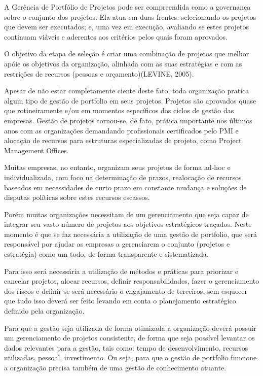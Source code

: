 \documentclass[12pt,a4paper,ruledheader,tocpage=prefix,floatnumber=continuous,pagestart=folhaderosto,font=times]{abnt}
\begin{document}
A Gerência de Portfólio de Projetos pode ser compreendida como a governança sobre o conjunto dos projetos. Ela atua em duas frentes: selecionando os 
projetos que devem ser executados; e, uma vez em execução, avaliando se estes projetos continuam viáveis e aderentes aos critérios pelos quais foram
aprovados.

O objetivo da etapa de seleção é criar uma combinação de projetos que melhor apóie os objetivos da organização, alinhada com as suas estratégias e 
com as restrições de recursos (pessoas e orçamento)(LEVINE, 2005).

Apesar de não estar completamente ciente deste fato, toda organização pratica algum tipo de gestão de portfolio em seus projetos. Projetos são aprovados 
quase que rotineiramente e/ou em momentos específicos dos ciclos de gestão das empresas. Gestão de projetos tornou-se, de fato, prática importante nos 
últimos anos com as organizações demandando profissionais certificados pelo PMI e alocação de recursos para estruturas especializadas de projeto, 
como Project Management Offices. 

Muitas empresas, no entanto, organizam seus projetos de forma ad-hoc e individualizada, com foco na determinação de prazos, realocação de recursos 
baseados em necessidades de curto prazo em constante mudança e soluções de disputas políticas sobre estes recursos escassos.\cite{artigo}

Porém muitas organizações necessitam de um gerenciamento que seja capaz de integrar seu vasto número de projetos aos objetivos estratégicos traçados.
Neste momento é que se faz necessária a utilização de uma gestão de portfolio, que será responsável por ajudar as empresas a gerenciarem o conjunto 
(projetos e estratégia) como um todo, de forma transparente e sistematizada. 

Para isso será necessária a utilização de métodos e práticas para priorizar e cancelar projetos, alocar recursos, definir responsabilidades, fazer o 
gerenciamento dos riscos e definir se será necessário o engajamento de terceiros, sem esquecer que tudo isso deverá ser feito levando em conta o 
planejamento estratégico definido pela organização.

Para que a gestão seja utilizada de forma otimizada a organização deverá possuir um gerenciamento de projetos consistente, de forma que seja possível 
levantar os dados relevantes para a gestão, tais como: tempo de desenvolvimento, recursos utilizadas, pessoal, investimento. Ou seja, para que a gestão 
de portfolio funcione a organização precisa também de uma gestão de conhecimento atuante.
\end{document}
